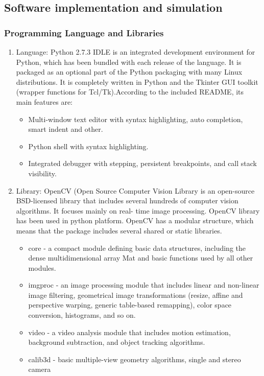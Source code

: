 \documentclass[12pt, a4paper]{article}
\begin{document}
\subsection{Software implementation and simulation}
\subsubsection{Programming Language and Libraries}
\begin{enumerate}
\item Language: Python 2.7.3
IDLE is an integrated development environment for Python, which has been bundled with each release of the language. It is packaged as an optional part of the Python packaging
with many Linux distributions. It is completely written in Python and the Tkinter GUI
toolkit (wrapper functions for Tcl/Tk).According to the included README, its main
features are:
\begin{itemize}
\item Multi-window text editor with syntax highlighting, auto completion, smart indent
and other.
\item Python shell with syntax highlighting.
\item Integrated debugger with stepping, persistent breakpoints, and call stack visibility.
\end{itemize}
\item Library: OpenCV (Open Source Computer Vision Library is an open-source BSD-licensed library
that includes several hundreds of computer vision algorithms. It focuses mainly on real-
time image processing. OpenCV library has been used in python platform.
OpenCV has a modular structure, which means that the package includes several shared or
static libraries.
\begin{itemize}
\item core - a compact module defining basic data structures, including the dense
multidimensional array Mat and basic functions used by all other modules.
\item imgproc - an image processing module that includes linear and non-linear image
filtering, geometrical image transformations (resize, affine and perspective warping,
generic table-based remapping), color space conversion, histograms, and so on.
\item video - a video analysis module that includes motion estimation, background
subtraction, and object tracking algorithms.
\item calib3d - basic multiple-view geometry algorithms, single and stereo camera

\end{itemize}
\end{enumerate}
\end{document}
